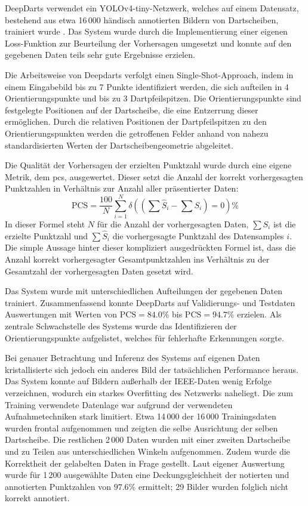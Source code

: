 DeepDarts verwendet ein YOLOv4-tiny-Netzwerk, welches auf einem Datensatz, bestehend aus etwa 16\,000 händisch annotierten Bildern von Dartscheiben, trainiert wurde \cite{deepdarts-data}. Das System wurde durch die Implementierung einer eigenen Loss-Funktion zur Beurteilung der Vorhersagen umgesetzt und konnte auf den gegebenen Daten teils sehr gute Ergebnisse erzielen.

Die Arbeitsweise von Deepdarts verfolgt einen Single-Shot-Approach, indem in einem Eingabebild bis zu 7 Punkte identifiziert werden, die sich aufteilen in 4 Orientierungspunkte und bis zu 3 Dartpfeilspitzen. Die Orientierungspunkte sind festgelegte Positionen auf der Dartscheibe, die eine Entzerrung dieser ermöglichen. Durch die relativen Positionen der Dartpfeilspitzen zu den Orientierungspunkten werden die getroffenen Felder anhand von nahezu standardisierten Werten der Dartscheibengeometrie abgeleitet.

Die Qualität der Vorhersagen der erzielten Punktzahl wurde durch eine eigene Metrik, dem \ac{pcs}, ausgewertet. Dieser setzt die Anzahl der korrekt vorhergesagten Punktzahlen in Verhältnis zur Anzahl aller präsentierter Daten:
\[ \text{PCS} = \frac{100}{N} \sum_{i=1}^{N} \delta \left(\left(\sum \hat{S}_i - \sum S_i\right) = 0\right)\% \]
In dieser Formel steht $N$ für die Anzahl der vorhergesagten Daten, $\sum S_i$ ist die erzielte Punktzahl und $\sum \hat{S}_i$ die vorhergesagte Punktzahl des Datensamples $i$. Die simple Aussage hinter dieser kompliziert ausgedrückten Formel ist, dass die Anzahl korrekt vorhergesagter Gesamtpunktzahlen ins Verhältnis zu der Gesamtzahl der vorhergesagten Daten gesetzt wird.

Das System wurde mit unterschiedlichen Aufteilungen der gegebenen Daten trainiert. Zusammenfassend konnte DeepDarts auf Validierungs- und Testdaten Auswertungen mit Werten von $\text{PCS} = 84.0\%$ bis $\text{PCS} = 94.7\%$ erzielen. Als zentrale Schwachstelle des Systems wurde das Identifizieren der Orientierungspunkte aufgelistet, welches für fehlerhafte Erkennungen sorgte.

Bei genauer Betrachtung und Inferenz des Systems auf eigenen Daten kristallisierte sich jedoch ein anderes Bild der tatsächlichen Performance heraus. Das System konnte auf Bildern außerhalb der IEEE-Daten wenig Erfolge verzeichnen, wodurch ein starkes Overfitting des Netzwerks naheliegt. Die zum Training verwendete Datenlage war aufgrund der verwendeten Aufnahmetechniken stark limitiert. Etwa 14\,000 der 16\,000 Trainingsdaten wurden frontal aufgenommen und zeigten die selbe Ausrichtung der selben Dartscheibe. Die restlichen 2\,000 Daten wurden mit einer zweiten Dartscheibe und zu Teilen aus unterschiedlichen Winkeln aufgenommen. Zudem wurde die Korrektheit der gelabelten Daten in Frage gestellt. Laut eigener Auswertung wurde für 1\,200 ausgewählte Daten eine Deckungsgleichheit der notierten und annotierten Punktzahlen von $97.6\%$ ermittelt; 29 Bilder wurden folglich nicht korrekt annotiert.

